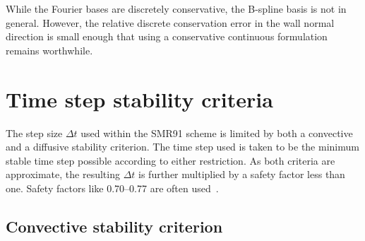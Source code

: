\documentclass[letterpaper,11pt,nointlimits,reqno,draft]{amsbook}
\begin{document}
While the Fourier bases are discretely conservative, the B-spline basis is not
in general.  However, the relative discrete conservation error in the wall
normal direction is small enough that using a conservative continuous
formulation remains worthwhile.

\section{Time step stability criteria}
\label{sec:stabilitycriteria}

The step size $\Delta{}t$ used within the SMR91 scheme is limited by both a
convective and a diffusive stability criterion.  The time step used is taken to
be the minimum stable time step possible according to either restriction.  As
both criteria are approximate, the resulting $\Delta{}t$ is further multiplied
by a safety factor less than one.  Safety factors like 0.70--0.77 are often
used~\citep{Venugopal2003,spalart_lowstoragerk}.

\subsection{Convective stability criterion}
\label{sec:convectivestability}
\end{document}
